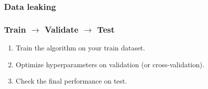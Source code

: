 \subsubsection*{Data leaking}

{\it <Examples with EEG and MRT>}

\subsubsection*{Train $\rightarrow$ Validate $\rightarrow$ Test}

\begin{enumerate}[label=$\bullet$]
  \item Train the algorithm on your train dataset.
  \item Optimize hyperparameters on validation (or cross-validation).
  \item Check the final performance on test.
\end{enumerate}